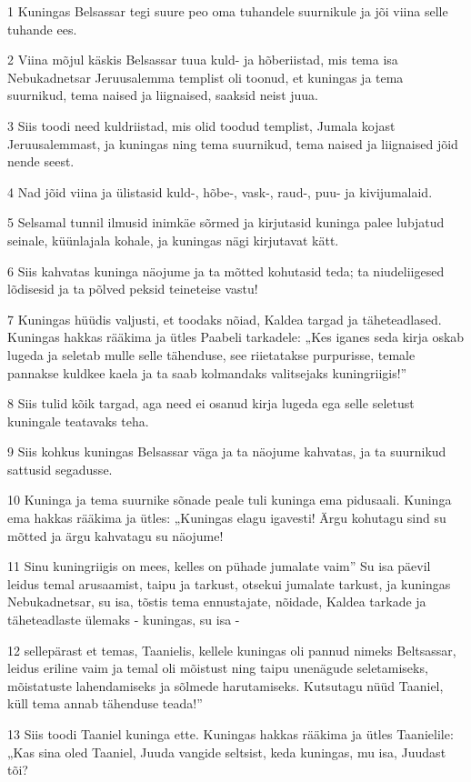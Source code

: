 \par 1 Kuningas Belsassar tegi suure peo oma tuhandele suurnikule ja jõi viina selle tuhande ees.
\par 2 Viina mõjul käskis Belsassar tuua kuld- ja hõberiistad, mis tema isa Nebukadnetsar Jeruusalemma templist oli toonud, et kuningas ja tema suurnikud, tema naised ja liignaised, saaksid neist juua.
\par 3 Siis toodi need kuldriistad, mis olid toodud templist, Jumala kojast Jeruusalemmast, ja kuningas ning tema suurnikud, tema naised ja liignaised jõid nende seest.
\par 4 Nad jõid viina ja ülistasid kuld-, hõbe-, vask-, raud-, puu- ja kivijumalaid.
\par 5 Selsamal tunnil ilmusid inimkäe sõrmed ja kirjutasid kuninga palee lubjatud seinale, küünlajala kohale, ja kuningas nägi kirjutavat kätt.
\par 6 Siis kahvatas kuninga näojume ja ta mõtted kohutasid teda; ta niudeliigesed lõdisesid ja ta põlved peksid teineteise vastu!
\par 7 Kuningas hüüdis valjusti, et toodaks nõiad, Kaldea targad ja täheteadlased. Kuningas hakkas rääkima ja ütles Paabeli tarkadele: „Kes iganes seda kirja oskab lugeda ja seletab mulle selle tähenduse, see riietatakse purpurisse, temale pannakse kuldkee kaela ja ta saab kolmandaks valitsejaks kuningriigis!”
\par 8 Siis tulid kõik targad, aga need ei osanud kirja lugeda ega selle seletust kuningale teatavaks teha.
\par 9 Siis kohkus kuningas Belsassar väga ja ta näojume kahvatas, ja ta suurnikud sattusid segadusse.
\par 10 Kuninga ja tema suurnike sõnade peale tuli kuninga ema pidusaali. Kuninga ema hakkas rääkima ja ütles: „Kuningas elagu igavesti! Ärgu kohutagu sind su mõtted ja ärgu kahvatagu su näojume!
\par 11 Sinu kuningriigis on mees, kelles on pühade jumalate vaim” Su isa päevil leidus temal arusaamist, taipu ja tarkust, otsekui jumalate tarkust, ja kuningas Nebukadnetsar, su isa, tõstis tema ennustajate, nõidade, Kaldea tarkade ja täheteadlaste ülemaks - kuningas, su isa -
\par 12 sellepärast et temas, Taanielis, kellele kuningas oli pannud nimeks Beltsassar, leidus eriline vaim ja temal oli mõistust ning taipu unenägude seletamiseks, mõistatuste lahendamiseks ja sõlmede harutamiseks. Kutsutagu nüüd Taaniel, küll tema annab tähenduse teada!”
\par 13 Siis toodi Taaniel kuninga ette. Kuningas hakkas rääkima ja ütles Taanielile: „Kas sina oled Taaniel, Juuda vangide seltsist, keda kuningas, mu isa, Juudast tõi?
